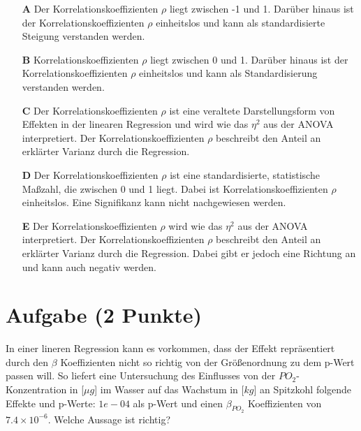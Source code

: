 \documentclass[a4paper, 9pt]{scrartcl}\usepackage[]{graphicx}\usepackage[]{xcolor}
\begin{document}
\begin{enumerate}
\item [\textbf{A} \msquare] Der Korrelationskoeffizienten $\rho$ liegt zwischen -1 und 1. Darüber hinaus ist der Korrelationskoeffizienten $\rho$ einheitslos und kann als standardisierte Steigung verstanden werden.
\item [\textbf{B} \msquare] Korrelationskoeffizienten $\rho$ liegt zwischen 0 und 1. Darüber hinaus ist der Korrelationskoeffizienten $\rho$ einheitslos und kann als Standardisierung verstanden werden.
\item [\textbf{C} \msquare] Der Korrelationskoeffizienten $\rho$ ist eine veraltete Darstellungsform von Effekten in der linearen Regression und wird wie das $\eta^2$ aus der ANOVA interpretiert. Der Korrelationskoeffizienten $\rho$ beschreibt den Anteil an erklärter Varianz durch die Regression.
\item [\textbf{D} \msquare] Der Korrelationskoeffizienten $\rho$ ist eine standardisierte, statistische Maßzahl, die zwischen 0 und 1 liegt. Dabei ist Korrelationskoeffizienten $\rho$ einheitslos. Eine Signifikanz kann nicht nachgewiesen werden.
\item [\textbf{E} \msquare] Der Korrelationskoeffizienten $\rho$ wird wie das $\eta^2$ aus der ANOVA interpretiert. Der Korrelationskoeffizienten $\rho$ beschreibt den Anteil an erklärter Varianz durch die Regression. Dabei gibt er jedoch eine Richtung an und kann auch negativ werden.
\end{enumerate}

\section{Aufgabe \hfill (2 Punkte)}



In einer lineren Regression kann es vorkommen, dass der Effekt repräsentiert durch den $\beta$ Koeffizienten nicht so richtig von der Größenordnung zu dem p-Wert passen will. So liefert eine Untersuchung des Einflusses von der $PO_2$-Konzentration in [$\mu g$] im Wasser auf das Wachstum in [$kg$] an Spitzkohl folgende Effekte und p-Werte: $1e-04$ als p-Wert und einen $\beta_{PO_2}$ Koeffizienten von $7.4\times 10^{-6}$. Welche Aussage ist richtig?
\end{document}
